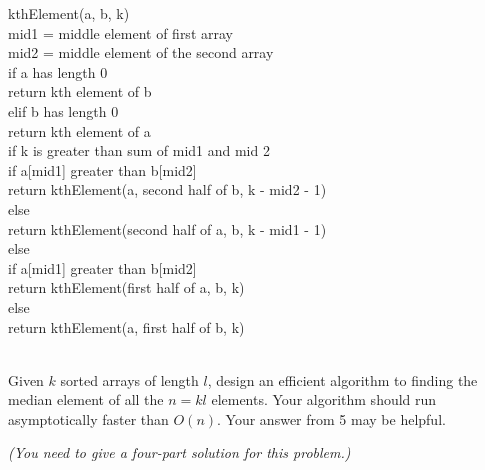 \begin{qunlist}
{kthElement(a, b, k)\\
\tab mid1 = middle element of first array\\
\tab mid2 = middle element of the second array\\
\tab if a has length 0\\
\tab \tab return kth element of b\\
\tab elif b has length 0\\
\tab \tab return kth element of a\\
\tab \tab if k is greater than sum of mid1 and mid 2\\
\tab \tab \tab if a[mid1] greater than b[mid2]\\
\tab \tab \tab \tab return kthElement(a, second half of b, k - mid2 - 1)\\
\tab \tab \tab else \\
\tab \tab \tab \tab return kthElement(second half of a, b, k - mid1 - 1)\\
\tab \tab else\\
\tab \tab \tab if a[mid1] greater than b[mid2]\\
\tab \tab \tab \tab return kthElement(first half of a, b, k)\\
\tab \tab \tab else \\
\tab \tab \tab \tab return kthElement(a, first half of b, k)\\

}

 \\
Given $k$ sorted arrays of length $l$, design an efficient algorithm to finding the median element of all the $n=kl$ elements. Your algorithm should run  asymptotically faster than $O(n)$. Your answer from 5 may be helpful.

{\em (You need to give a four-part solution for this problem.)}

\answer{}


\end{qunlist}
